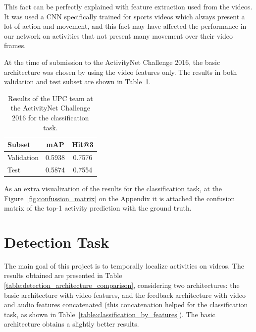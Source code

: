 This fact can be perfectly explained with feature extraction used from the videos. It was used a CNN specifically trained for sports videos which always present a lot of action and movement, and this fact may have affected the performance in our network on activities that not present many movement over their video frames.

At the time of submission to the ActivityNet Challenge 2016, the basic architecture was chosen by using the video features only. The results in both validation and test subset are shown in Table~\ref{table:classification_results_challenge}.

\begin{table}[H]
\begin{center}
\begin{tabular}{|l|c|c|}
\hline
Subset & mAP & Hit@3 \\
\hline\hline
Validation & 0.5938 & 0.7576 \\
Test & 0.5874 & 0.7554 \\
\hline
\end{tabular}
\end{center}
\caption{Results of the UPC team at the ActivityNet Challenge 2016 for the classification task.}
\label{table:classification_results_challenge}
\end{table}

As an extra visualization of the results for the classification task, at the Figure~\ref{fig:confussion_matrix} on the Appendix it is attached the confusion matrix of the top-1 activity prediction with the ground truth.



\section{Detection Task}

The main goal of this project is to temporally localize activities on videos. The results obtained are presented in Table \ref{table:detection_architecture_comparison}, considering two architectures: the basic architecture with video features, and the feedback architecture with video and audio features concatenated (this concatenation helped for the classification task, as shown in Table~\ref{table:classification_by_features}).
The basic architecture obtains a slightly better results.


